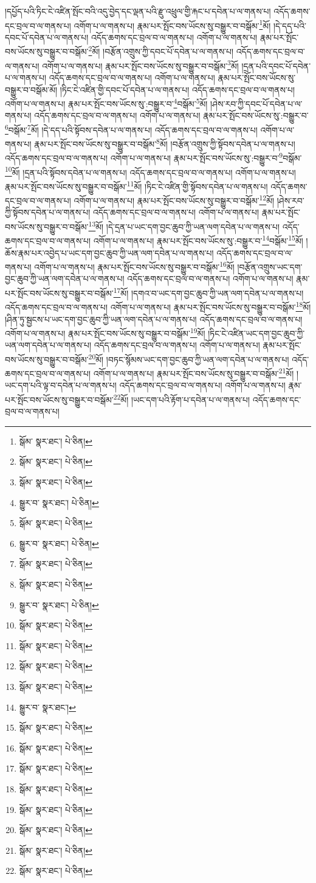 །དཔྱོད་པའི་ཏིང་ངེ་འཛིན་སྤོང་བའི་འདུ་བྱེད་དང་ལྡན་པའི་རྫུ་འཕྲུལ་གྱི་རྐང་པ་དབེན་པ་ལ་གནས་པ། འདོད་ཆགས་དང་བྲལ་བ་ལ་གནས་པ། འགོག་པ་ལ་གནས་པ། རྣམ་པར་སྤོང་བས་ཡོངས་སུ་བསྒྱུར་བ་བསྒོམ་\footnote{སྒོམ་  སྣར་ཐང་།  པེ་ཅིན། }མོ། །དེ་དད་པའི་དབང་པོ་དབེན་པ་ལ་གནས་པ། འདོད་ཆགས་དང་བྲལ་བ་ལ་གནས་པ། འགོག་པ་ལ་གནས་པ། རྣམ་པར་སྤོང་བས་ཡོངས་སུ་བསྒྱུར་བ་བསྒོམ་\footnote{སྒོམ་  སྣར་ཐང་།  པེ་ཅིན། }མོ། །བརྩོན་འགྲུས་ཀྱི་དབང་པོ་དབེན་པ་ལ་གནས་པ། འདོད་ཆགས་དང་བྲལ་བ་ལ་གནས་པ། འགོག་པ་ལ་གནས་པ། རྣམ་པར་སྤོང་བས་ཡོངས་སུ་བསྒྱུར་བ་བསྒོམ་\footnote{སྒོམ་  སྣར་ཐང་།  པེ་ཅིན། }མོ། །དྲན་པའི་དབང་པོ་དབེན་པ་ལ་གནས་པ། འདོད་ཆགས་དང་བྲལ་བ་ལ་གནས་པ། འགོག་པ་ལ་གནས་པ། རྣམ་པར་སྤོང་བས་ཡོངས་སུ་བསྒྱུར་བ་བསྒོམ་མོ། །ཏིང་ངེ་འཛིན་གྱི་དབང་པོ་དབེན་པ་ལ་གནས་པ། འདོད་ཆགས་དང་བྲལ་བ་ལ་གནས་པ། འགོག་པ་ལ་གནས་པ། རྣམ་པར་སྤོང་བས་ཡོངས་སུ་:བསྒྱུར་བ་\footnote{སྒྱུར་བ་  སྣར་ཐང་།  པེ་ཅིན། }བསྒོམ་\footnote{སྒོམ་  སྣར་ཐང་།  པེ་ཅིན། }མོ། །ཤེས་རབ་ཀྱི་དབང་པོ་དབེན་པ་ལ་གནས་པ། འདོད་ཆགས་དང་བྲལ་བ་ལ་གནས་པ། འགོག་པ་ལ་གནས་པ། རྣམ་པར་སྤོང་བས་ཡོངས་སུ་:བསྒྱུར་བ་\footnote{སྒྱུར་བ་  སྣར་ཐང་།  པེ་ཅིན། }བསྒོམ་\footnote{སྒོམ་  སྣར་ཐང་།  པེ་ཅིན། }མོ། །དེ་དད་པའི་སྟོབས་དབེན་པ་ལ་གནས་པ། འདོད་ཆགས་དང་བྲལ་བ་ལ་གནས་པ། འགོག་པ་ལ་གནས་པ། རྣམ་པར་སྤོང་བས་ཡོངས་སུ་བསྒྱུར་བ་བསྒོམ་\footnote{སྒོམ་  སྣར་ཐང་།  པེ་ཅིན། }མོ། །བརྩོན་འགྲུས་ཀྱི་སྟོབས་དབེན་པ་ལ་གནས་པ། འདོད་ཆགས་དང་བྲལ་བ་ལ་གནས་པ། འགོག་པ་ལ་གནས་པ། རྣམ་པར་སྤོང་བས་ཡོངས་སུ་:བསྒྱུར་བ་\footnote{སྒྱུར་བ་  སྣར་ཐང་།  པེ་ཅིན། }བསྒོམ་\footnote{སྒོམ་  སྣར་ཐང་།  པེ་ཅིན། }མོ། །དྲན་པའི་སྟོབས་དབེན་པ་ལ་གནས་པ། འདོད་ཆགས་དང་བྲལ་བ་ལ་གནས་པ། འགོག་པ་ལ་གནས་པ། རྣམ་པར་སྤོང་བས་ཡོངས་སུ་བསྒྱུར་བ་བསྒོམ་\footnote{སྒོམ་  སྣར་ཐང་།  པེ་ཅིན། }མོ། །ཏིང་ངེ་འཛིན་གྱི་སྟོབས་དབེན་པ་ལ་གནས་པ། འདོད་ཆགས་དང་བྲལ་བ་ལ་གནས་པ། འགོག་པ་ལ་གནས་པ། རྣམ་པར་སྤོང་བས་ཡོངས་སུ་བསྒྱུར་བ་བསྒོམ་\footnote{སྒོམ་  སྣར་ཐང་།  པེ་ཅིན། }མོ། །ཤེས་རབ་ཀྱི་སྟོབས་དབེན་པ་ལ་གནས་པ། འདོད་ཆགས་དང་བྲལ་བ་ལ་གནས་པ། འགོག་པ་ལ་གནས་པ། རྣམ་པར་སྤོང་བས་ཡོངས་སུ་བསྒྱུར་བ་བསྒོམ་\footnote{སྒོམ་  སྣར་ཐང་།  པེ་ཅིན། }མོ། །དེ་དྲན་པ་ཡང་དག་བྱང་ཆུབ་ཀྱི་ཡན་ལག་དབེན་པ་ལ་གནས་པ། འདོད་ཆགས་དང་བྲལ་བ་ལ་གནས་པ། འགོག་པ་ལ་གནས་པ། རྣམ་པར་སྤོང་བས་ཡོངས་སུ་:བསྒྱུར་བ་\footnote{སྒྱུར་བ་  སྣར་ཐང་། }བསྒོམ་\footnote{སྒོམ་  སྣར་ཐང་།  པེ་ཅིན། }མོ། །ཆོས་རྣམ་པར་འབྱེད་པ་ཡང་དག་བྱང་ཆུབ་ཀྱི་ཡན་ལག་དབེན་པ་ལ་གནས་པ། འདོད་ཆགས་དང་བྲལ་བ་ལ་གནས་པ། འགོག་པ་ལ་གནས་པ། རྣམ་པར་སྤོང་བས་ཡོངས་སུ་བསྒྱུར་བ་བསྒོམ་\footnote{སྒོམ་  སྣར་ཐང་།  པེ་ཅིན། }མོ། །བརྩོན་འགྲུས་ཡང་དག་བྱང་ཆུབ་ཀྱི་ཡན་ལག་དབེན་པ་ལ་གནས་པ། འདོད་ཆགས་དང་བྲལ་བ་ལ་གནས་པ། འགོག་པ་ལ་གནས་པ། རྣམ་པར་སྤོང་བས་ཡོངས་སུ་བསྒྱུར་བ་བསྒོམ་\footnote{སྒོམ་  སྣར་ཐང་།  པེ་ཅིན། }མོ། །དགའ་བ་ཡང་དག་བྱང་ཆུབ་ཀྱི་ཡན་ལག་དབེན་པ་ལ་གནས་པ། འདོད་ཆགས་དང་བྲལ་བ་ལ་གནས་པ། འགོག་པ་ལ་གནས་པ། རྣམ་པར་སྤོང་བས་ཡོངས་སུ་བསྒྱུར་བ་བསྒོམ་\footnote{སྒོམ་  སྣར་ཐང་།  པེ་ཅིན། }མོ། །ཤིན་ཏུ་སྦྱངས་པ་ཡང་དག་བྱང་ཆུབ་ཀྱི་ཡན་ལག་དབེན་པ་ལ་གནས་པ། འདོད་ཆགས་དང་བྲལ་བ་ལ་གནས་པ། འགོག་པ་ལ་གནས་པ། རྣམ་པར་སྤོང་བས་ཡོངས་སུ་བསྒྱུར་བ་བསྒོམ་\footnote{སྒོམ་  སྣར་ཐང་།  པེ་ཅིན། }མོ། །ཏིང་ངེ་འཛིན་ཡང་དག་བྱང་ཆུབ་ཀྱི་ཡན་ལག་དབེན་པ་ལ་གནས་པ། འདོད་ཆགས་དང་བྲལ་བ་ལ་གནས་པ། འགོག་པ་ལ་གནས་པ། རྣམ་པར་སྤོང་བས་ཡོངས་སུ་བསྒྱུར་བ་བསྒོམ་\footnote{སྒོམ་  སྣར་ཐང་།  པེ་ཅིན། }མོ། །བཏང་སྙོམས་ཡང་དག་བྱང་ཆུབ་ཀྱི་ཡན་ལག་དབེན་པ་ལ་གནས་པ། འདོད་ཆགས་དང་བྲལ་བ་ལ་གནས་པ། འགོག་པ་ལ་གནས་པ། རྣམ་པར་སྤོང་བས་ཡོངས་སུ་བསྒྱུར་བ་བསྒོམ་\footnote{སྒོམ་  སྣར་ཐང་།  པེ་ཅིན། }མོ། །ཡང་དག་པའི་ལྟ་བ་དབེན་པ་ལ་གནས་པ། འདོད་ཆགས་དང་བྲལ་བ་ལ་གནས་པ། འགོག་པ་ལ་གནས་པ། རྣམ་པར་སྤོང་བས་ཡོངས་སུ་བསྒྱུར་བ་བསྒོམ་\footnote{སྒོམ་  སྣར་ཐང་།  པེ་ཅིན། }མོ། །ཡང་དག་པའི་རྟོག་པ་དབེན་པ་ལ་གནས་པ། འདོད་ཆགས་དང་བྲལ་བ་ལ་གནས་པ། 